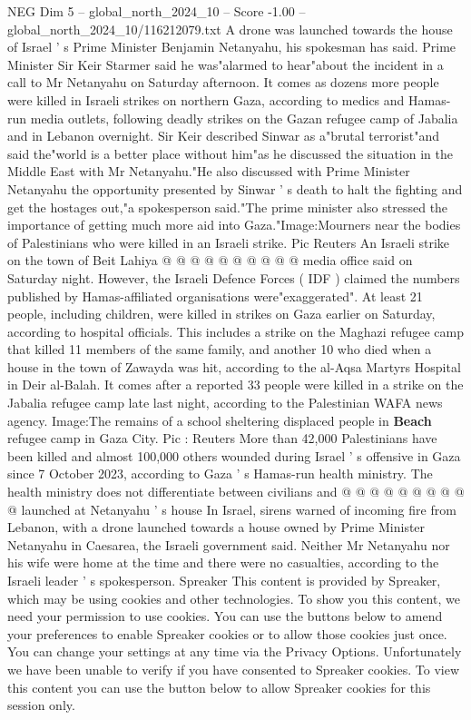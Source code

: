 \begin{textsample}{NEG Dim 5 – global\_north\_2024\_10 – Score -1.00 – global\_north\_2024\_10/116212079.txt}  \label{ex:f5_neg_057}
A drone was launched towards the house of Israel ' s Prime Minister Benjamin Netanyahu, his spokesman has said.
Prime Minister Sir Keir Starmer said he was"alarmed to hear"about the incident in a call to Mr Netanyahu on Saturday afternoon.
It comes as dozens more people were killed in Israeli strikes on northern Gaza, according to medics and Hamas-run media outlets, following deadly strikes on the Gazan refugee camp of Jabalia and in Lebanon overnight.
Sir Keir described Sinwar as a"brutal terrorist"and said the"world is a better place without him"as he discussed the situation in the Middle East with Mr Netanyahu."He also discussed with Prime Minister Netanyahu the opportunity presented by Sinwar ' s death to halt the fighting and get the hostages out,"a spokesperson said."The prime minister also stressed the importance of getting much more aid into Gaza."Image:Mourners near the bodies of Palestinians who were killed in an Israeli strike.
Pic Reuters An Israeli strike on the town of Beit Lahiya @ @ @ @ @ @ @ @ @ @ media office said on Saturday night.
However, the Israeli Defence Forces ( IDF ) claimed the numbers published by Hamas-affiliated organisations were"exaggerated".
At least 21 people, including children, were killed in strikes on Gaza earlier on Saturday, according to hospital officials.
This includes a strike on the Maghazi refugee camp that killed 11 members of the same family, and another 10 who died when a house in the town of Zawayda was hit, according to the al-Aqsa Martyrs Hospital in Deir al-Balah.
It comes after a reported 33 people were killed in a strike on the Jabalia refugee camp late last night, according to the Palestinian WAFA news agency.
Image:The remains of a school sheltering displaced people in \textbf{Beach} refugee camp in Gaza City.
Pic : Reuters More than 42,000 Palestinians have been killed and almost 100,000 others wounded during Israel ' s offensive in Gaza since 7 October 2023, according to Gaza ' s Hamas-run health ministry.
The health ministry does not differentiate between civilians and @ @ @ @ @ @ @ @ @ @ launched at Netanyahu ' s house In Israel, sirens warned of incoming fire from Lebanon, with a drone launched towards a house owned by Prime Minister Netanyahu in Caesarea, the Israeli government said.
Neither Mr Netanyahu nor his wife were home at the time and there were no casualties, according to the Israeli leader ' s spokesperson.
Spreaker This content is provided by Spreaker, which may be using cookies and other technologies.
To show you this content, we need your permission to use cookies.
You can use the buttons below to amend your preferences to enable Spreaker cookies or to allow those cookies just once.
You can change your settings at any time via the Privacy Options.
Unfortunately we have been unable to verify if you have consented to Spreaker cookies.
To view this content you can use the button below to allow Spreaker cookies for this session only.

\end{textsample}
